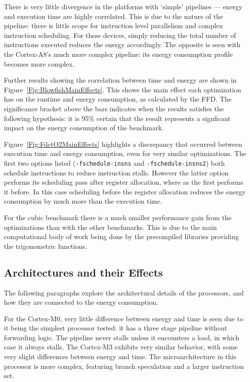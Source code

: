 \documentclass[twocolumn]{article}
\begin{document}
There is very little divergence in the platforms with `simple' pipelines --- energy and execution time are highly correlated. This is due to the nature of the pipeline: there is little scope for instruction level parallelism and complex instruction scheduling. For these devices, simply reducing the total number of instructions executed reduces the energy accordingly. The opposite is seen with the Cortex-A8's much more complex pipeline: its energy consumption profile becomes more complex.

Further results showing the correlation between time and energy are shown in Figure~\ref{Fig:BlowfishMainEffects}. This shows the main effect each optimization has on the runtime and energy consumption, as calculated by the FFD. The significance bracket above the bars indicates when the results satisfies the following hypothesis: it is 95\% certain that the result represents a signficant impact on the energy consumption of the benchmark.

Figure~\ref{Fig:FdctO2MainEffects} highlights a discrepancy that occurred between execution time and energy consumption, even for very similar optimizations. The first two options listed (\texttt{-fschedule-insns} and \texttt{-fschedule-insns2}) both schedule instructions to reduce instruction stalls. However the latter option performs its scheduling pass after register allocation, where as the first performs it before. In this case scheduling before the register allocation reduces the energy consumption by much more than the execution time.

For the cubic benchmark there is a much smaller performance gain from the optimizations than with the other benchmarks. This is due to the main computational body of work being done by the precompiled libraries providing the trigonometric functions.

\subsection{Architectures and their Effects}

The following paragraphs explore the architectural details of the processors, and how they are connected to the energy consumption.

For the Cortex-M0, very little difference between energy and time is seen due to it being the simplest processor tested: it has a three stage pipeline without forwarding logic. The pipeline never stalls unless it encounters a load, in which case it always stalls. The Cortex-M3 exhibits very similar behavior, with some very slight differences between energy and time. The microarchitecture in this processor is more complex, featuring branch speculation and a larger instruction set\cite{Yiu2010}.
\end{document}
